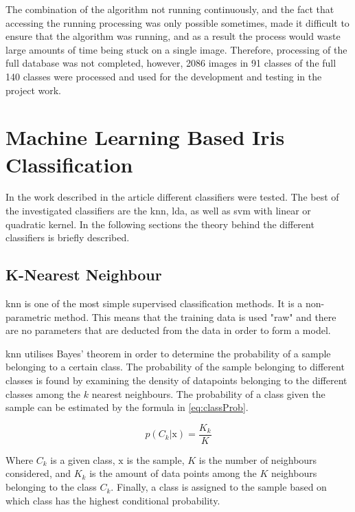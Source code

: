 The combination of the algorithm not running continuously, and the fact that accessing the running processing was only possible sometimes, made it difficult to ensure that the algorithm was running, and as a result the process would waste large amounts of time being stuck on a single image. Therefore, processing of the full database was not completed, however, 2086 images in 91 classes of the full 140 classes were processed and used for the development and testing in the project work. 


\section{Machine Learning Based Iris Classification}
\label{MachineLearnClassification}
In the work described in the article different classifiers were tested. The best of the investigated classifiers are the \gls{knn}, \gls{lda}, as well as \gls{svm} with linear or quadratic kernel. In the following sections the theory behind the different classifiers is briefly described.

\subsection{K-Nearest Neighbour}
\gls{knn} is one of the most simple supervised classification methods. It is a non-parametric method. This means that the training data is used "raw" and there are no parameters that are deducted from the data in order to form a model. 
 
\gls{knn} utilises Bayes' theorem in order to determine the probability of a sample belonging to a certain class. The probability of the sample belonging to different classes is found by examining the density of datapoints belonging to the different classes among the $k$ nearest neighbours. The probability of a class given the sample can be estimated by the formula in \autoref{eq:classProb}.

 \begin{equation}\label{eq:classProb}
	p(C_k|\text{x})=\frac{K_k}{K}
\end{equation}

Where $C_k$ is a given class, $\text{x}$ is the sample, $K$ is the number of neighbours considered, and $K_k$ is the amount of data points among the $K$ neighbours belonging to the class $C_k$. Finally, a class is assigned to the sample based on which class has the highest conditional probability.

